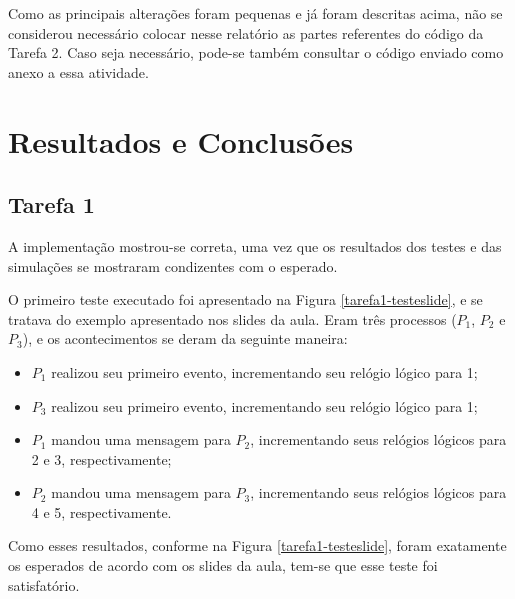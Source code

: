 \documentclass[conference]{IEEEtran}
\begin{document}
Como as principais alterações foram pequenas e já foram descritas acima, não se considerou necessário colocar nesse relatório as partes referentes do código da Tarefa 2. Caso seja necessário, pode-se também consultar o código enviado como anexo a essa atividade. 

\section{Resultados e Conclusões} \label{results}

\subsection{Tarefa 1}

	A implementação mostrou-se correta, uma vez que os resultados dos testes e das simulações se mostraram condizentes com o esperado.
	
	O primeiro teste executado foi apresentado na Figura \ref{tarefa1-testeslide}, e se tratava do exemplo apresentado nos slides da aula. Eram três processos ($P_1$, $P_2$ e $P_3$), e os acontecimentos se deram da seguinte maneira:
	
\begin{itemize}
\item $P_1$ realizou seu primeiro evento, incrementando seu relógio lógico para 1;
\item $P_3$ realizou seu primeiro evento, incrementando seu relógio lógico para 1;
\item $P_1$ mandou uma mensagem para $P_2$, incrementando seus relógios lógicos para 2 e 3, respectivamente;
\item $P_2$ mandou uma mensagem para $P_3$, incrementando seus relógios lógicos para 4 e 5, respectivamente.
\end{itemize}

	Como esses resultados, conforme na Figura \ref{tarefa1-testeslide}, foram exatamente os esperados de acordo com os slides da aula, tem-se que esse teste foi satisfatório.
	
\end{document}
